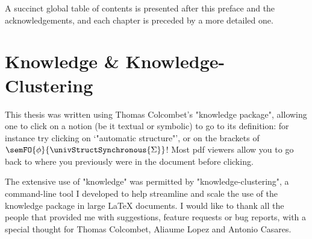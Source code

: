 \begin{marginfigure}
	\centering
	\caption{\AP\label{fig:chapter-dependency-graph}
		Dependency graph of the chapters of this thesis.}
\end{marginfigure}
A succinct global table of contents is presented after this preface and the acknowledgements,
and each chapter is preceded by a more detailed one.

\section*{Knowledge \& Knowledge-Clustering}
This thesis was written using Thomas Colcombet's "knowledge package", allowing
one to click on a notion (be it textual or symbolic) to go to its definition:
for instance try clicking on `"automatic structure"', or on the brackets of
$\semFO{\phi}{\univStructSynchronous{\Sigma}}$!
Most pdf viewers allow you to go back to where you previously were
in the document before clicking.

The extensive use of "knowledge" was permitted by "knowledge-clustering",
a command-line tool I developed to help streamline and scale the use
of the knowledge package in large LaTeX documents.
I would like to thank all the people that provided me with suggestions,
feature requests or bug reports, with a special thought for Thomas Colcombet, Aliaume Lopez
and Antonio Casares.

